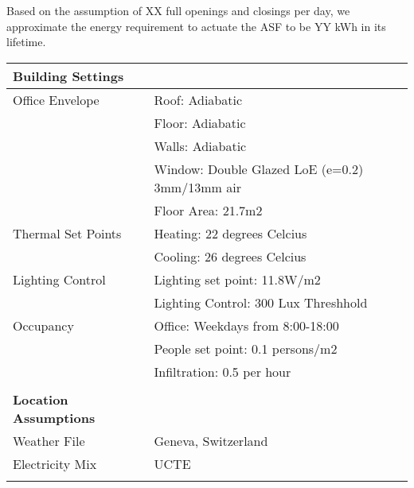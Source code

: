 Based on the assumption of XX full openings and closings per day, we approximate the energy requirement to actuate the ASF to be YY kWh in its lifetime.\\

\begin{table}[H]
\centering
\begin{tabular}{ll}

\textbf{Building Settings}    &                                                \\
\hline
Office Envelope               & Roof: Adiabatic                                \\
                              & Floor: Adiabatic                               \\
                              & Walls: Adiabatic                               \\
                              & Window: Double Glazed LoE (e=0.2) 3mm/13mm air \\
                              & Floor Area: 21.7m2                             \\
\hline                           
Thermal Set Points            & Heating: 22 degrees Celcius                    \\
                              & Cooling: 26 degrees Celcius                    \\
\hline
Lighting Control              & Lighting set point: 11.8W/m2                   \\
                              & Lighting Control: 300 Lux Threshhold           \\
\hline
Occupancy                     & Office: Weekdays from 8:00-18:00               \\
                              & People set point: 0.1 persons/m2               \\
                              & Infiltration: 0.5 per hour                     \\
                              &                                                \\

\textbf{Location Assumptions} &                                                \\
\hline
Weather File                  & Geneva, Switzerland                            \\
Electricity Mix               & UCTE                                           \\
                              &                                                \\


\end{tabular}
\end{table}
